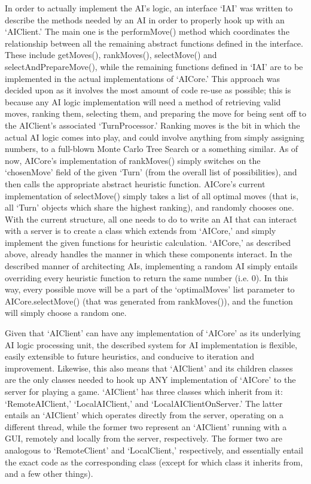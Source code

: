 \documentclass[a4paper,doc,draftfirst]{apa6}
\begin{document}
In order to actually implement the AI’s logic, an interface ‘IAI’ was written to describe the methods needed by an AI in order to properly hook up with an ‘AIClient.’ The main one is the performMove() method which coordinates the relationship between all the remaining abstract functions defined in the interface. These include getMoves(), rankMoves(), selectMove() and selectAndPrepareMove(), while the remaining functions defined in ‘IAI’ are to be implemented in the actual implementations of ‘AICore.’ This approach was decided upon as it involves the most amount of code re-use as possible; this is because any AI logic implementation will need a method of retrieving valid moves, ranking them, selecting them, and preparing the move for being sent off to the AIClient’s associated ‘TurnProcessor.’ Ranking moves is the bit in which the actual AI logic comes into play, and could involve anything from simply assigning numbers, to a full-blown Monte Carlo Tree Search or a something similar. As of now, AICore’s implementation of rankMoves() simply switches on the ‘chosenMove’ field of the given ‘Turn’  (from the overall list of possibilities), and then calls the appropriate abstract heuristic function. AICore’s current implementation of selectMove() simply takes a list of all optimal moves (that is, all ‘Turn’ objects which share the highest ranking), and randomly chooses one. With the current structure, all one needs to do to write an AI that can interact with a server is to create a class which extends from ‘AICore,’ and simply implement the given functions for heuristic calculation. ‘AICore,’ as described above, already handles the manner in which these components interact. In the described manner of architecting AIs, implementing a random AI simply entails overriding every heuristic function to return the same number (i.e. 0). In this way, every possible move will be a part of the ‘optimalMoves’ list parameter to AICore.selectMove() (that was generated from rankMoves()), and the function will simply choose a random one.

Given that ‘AIClient’ can have any implementation of ‘AICore’ as its underlying AI logic processing unit, the described system for AI implementation is flexible, easily extensible to future heuristics, and conducive to iteration and improvement. Likewise, this also means that ‘AIClient’ and its children classes are the only classes needed to hook up ANY implementation of ‘AICore’ to the server for playing a game. ‘AIClient’ has three classes which inherit from it: ‘RemoteAIClient,’ ‘LocalAIClient,’ and ‘LocalAIClientOnServer.’ The latter entails an ‘AIClient’ which operates directly from the server, operating on a different thread, while the former two represent an ‘AIClient’ running with a GUI, remotely and locally from the server, respectively. The former two are analogous to ‘RemoteClient’ and ‘LocalClient,’ respectively, and essentially entail the exact code as the corresponding class (except for which class it inherits from, and a few other things).
\end{document}
